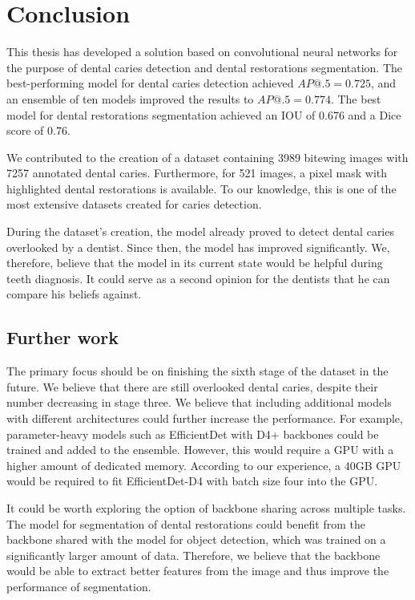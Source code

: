 \chapter{Conclusion}

This thesis has developed a solution based on convolutional neural networks for the purpose of dental caries detection and dental restorations segmentation. The best-performing model for dental caries detection achieved $AP@.5=0.725$, and an ensemble of ten models improved the results to $AP@.5=0.774$. The best model for dental restorations segmentation achieved an IOU of 0.676 and a Dice score of 0.76.

\medskip
We contributed to the creation of a dataset containing 3989 bitewing images with 7257 annotated dental caries. Furthermore, for 521 images, a pixel mask with highlighted dental restorations is available. To our knowledge, this is one of the most extensive datasets created for caries detection.

\medskip
During the dataset's creation, the model already proved to detect dental caries overlooked by a dentist. Since then, the model has improved significantly. We, therefore, believe that the model in its current state would be helpful during teeth diagnosis. It could serve as a second opinion for the dentists that he can compare his beliefs against.

\section*{Further work}
The primary focus should be on finishing the sixth stage of the dataset in the future. We believe that there are still overlooked dental caries, despite their number decreasing in stage three.
\medskip
We believe that including additional models with different architectures could further increase the performance. For example, parameter-heavy models such as EfficientDet with D4+ backbones could be trained and added to the ensemble. However, this would require a GPU with a higher amount of dedicated memory. According to our experience, a 40GB GPU would be required to fit EfficientDet-D4 with batch size four into the GPU.

\medskip
It could be worth exploring the option of backbone sharing across multiple tasks. The model for segmentation of dental restorations could benefit from the backbone shared with the model for object detection, which was trained on a significantly larger amount of data. Therefore, we believe that the backbone would be able to extract better features from the image and thus improve the performance of segmentation.



